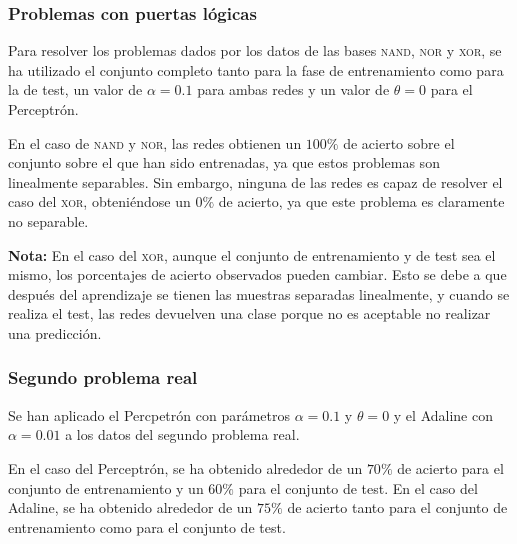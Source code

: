 \documentclass[spanish]{assignment}
\begin{document}
	\subsubsection{Problemas con puertas lógicas}
	Para resolver los problemas dados por los datos de las bases \textsc{nand}, \textsc{nor} y \textsc{xor}, se ha utilizado el conjunto completo tanto para la fase de entrenamiento como para la de test, un valor de $\alpha = 0.1$ para ambas redes y un valor de $\theta = 0$ para el Perceptrón.
	
	En el caso de \textsc{nand} y \textsc{nor}, las redes obtienen un $100\%$ de acierto sobre el conjunto sobre el que han sido entrenadas, ya que estos problemas son linealmente separables. Sin embargo, ninguna de las redes es capaz de resolver el caso del \textsc{xor}, obteniéndose un $0\%$ de acierto, ya que este problema es claramente no separable. 
	
	\textbf{Nota: } En el caso del \textsc{xor}, aunque el conjunto de entrenamiento y de test sea el mismo, los porcentajes de acierto observados pueden cambiar. Esto se debe a que después del aprendizaje se tienen las muestras separadas linealmente, y cuando se realiza el test, las redes devuelven una clase porque no es aceptable no realizar una predicción. 
	
	\subsubsection{Segundo problema real}
	Se han aplicado el Percpetrón con parámetros $\alpha = 0.1$ y $\theta = 0$ y el Adaline con $\alpha = 0.01$ a los datos del segundo problema real. 
	
	\newpage
	En el caso del Perceptrón, se ha obtenido alrededor de un $70\%$ de acierto para el conjunto de entrenamiento y un $60\%$ para el conjunto de test. En el caso del Adaline, se ha obtenido alrededor de un $75\%$ de acierto tanto para el conjunto de entrenamiento como para el conjunto de test.
\end{document}
